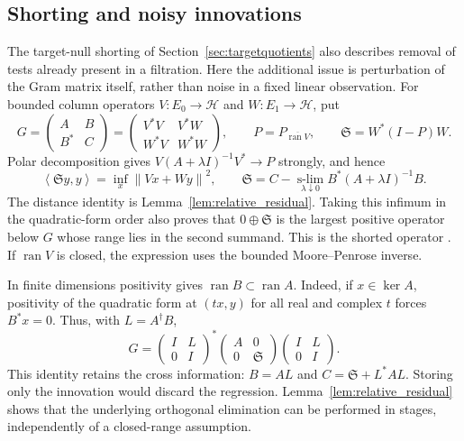 \documentclass[11pt,a4paper]{amsart}
\numberwithin{equation}{section}
\theoremstyle{definition}
\theoremstyle{remark}
\newcommand{\HH}{\mathcal H}
\DeclareMathOperator{\ran}{ran}
\newcommand{\norm}[1]{\left\lVert#1\right\rVert}
\newcommand{\ip}[2]{\left\langle#1,#2\right\rangle}
\begin{document}
\subsection{Shorting and noisy innovations}
The target-null shorting of Section~\ref{sec:targetquotients} also describes removal of tests already present in a filtration. Here the additional issue is perturbation of the Gram matrix itself, rather than noise in a fixed linear observation. For bounded column operators $V:E_0\to\HH$ and $W:E_1\to\HH$, put
\[
 G=\begin{pmatrix}A&B\\B^*&C\end{pmatrix}
 =\begin{pmatrix}V^*V&V^*W\\W^*V&W^*W\end{pmatrix},\qquad
 P=P_{\overline{\ran V}},\qquad \mathfrak S=W^*(I-P)W.
\]
Polar decomposition gives $V(A+\lambda I)^{-1}V^*\to P$ strongly, and hence
\begin{equation}\label{eq:shorting}
 \ip{\mathfrak Sy}y=\inf_x\norm{Vx+Wy}^2,\qquad
 \mathfrak S=C-\operatorname*{s-lim}_{\lambda\downarrow0}
 B^*(A+\lambda I)^{-1}B.
\end{equation}
The distance identity is Lemma~\ref{lem:relative_residual}. Taking this infimum in the quadratic-form order also proves that $0\oplus\mathfrak S$ is the largest positive operator below $G$ whose range lies in the second summand. This is the shorted operator \cite{AT,Ando}. If $\ran V$ is closed, the expression uses the bounded Moore--Penrose inverse.

In finite dimensions positivity gives $\ran B\subset\ran A$. Indeed, if $x\in\ker A$, positivity of the quadratic form at $(tx,y)$ for all real and complex $t$ forces $B^*x=0$. Thus, with $L=A^\dagger B$,
\begin{equation}\label{eq:innovation_triangular_gram}
 G=
 \begin{pmatrix}I&L\\0&I\end{pmatrix}^{\!*}
 \begin{pmatrix}A&0\\0&\mathfrak S\end{pmatrix}
 \begin{pmatrix}I&L\\0&I\end{pmatrix}.
\end{equation}
This identity retains the cross information: $B=AL$ and $C=\mathfrak S+L^*AL$. Storing only the innovation would discard the regression. Lemma~\ref{lem:relative_residual} shows that the underlying orthogonal elimination can be performed in stages, independently of a closed-range assumption.
\end{document}
